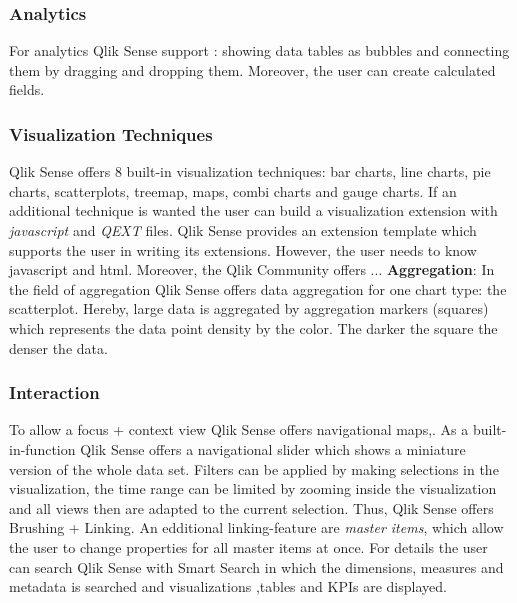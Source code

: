 \subsubsection*{Analytics}
For analytics Qlik Sense support : showing data tables as bubbles and connecting them by dragging and dropping them. Moreover, the user can create calculated fields\cite{qlikCalculated}.

\subsubsection*{Visualization Techniques}
Qlik Sense offers 8 built-in visualization techniques: bar charts, line charts, pie charts, scatterplots, treemap, maps, combi charts and gauge charts. If an additional technique is wanted the user can build a visualization extension with \textit{javascript} and \textit{QEXT} files\cite{qlikWorkbench}. Qlik Sense provides an extension template which supports the user in writing its extensions. However, the user needs to know javascript and html\cite{qlikVisExtensions}. Moreover, the Qlik Community offers ...
\textbf{Aggregation}: In the field of aggregation Qlik Sense offers data aggregation for one chart type: the scatterplot. Hereby, large data is aggregated by aggregation markers (squares) which represents the data point density by the color. The darker the square the denser the data\cite{qlikScatter}. 

\subsubsection*{Interaction}
To allow a focus + context view Qlik Sense offers navigational maps\cite{beard1990navigational},.
As a built-in-function Qlik Sense offers a navigational slider which shows a miniature version of the whole data set\cite{beard1990navigational}. 
Filters can be applied by making selections in the visualization\cite{qlikSheet}, the time range can be limited by zooming inside the visualization\cite{qlikTime} and all views then are adapted to the current selection. Thus, Qlik Sense offers Brushing + Linking. An edditional linking-feature are \textit{master items}\cite{qlikChangeData}, which allow the user to change properties for all master items at once.
For details the user can search Qlik Sense with Smart Search in which the dimensions, measures and metadata is searched and visualizations ,tables and KPIs are displayed\cite{qlikSmart}.  

